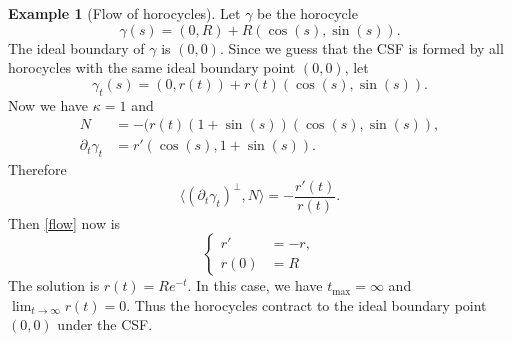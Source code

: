 \documentclass[12pt]{amsart}
\theoremstyle{plain}
\theoremstyle{definition}
\newtheorem{example}[theorem]{Example}
\begin{document}
\begin{example}[Flow of horocycles]
\label{ex:circle2}
Let $\gamma$ be the horocycle 
$$\gamma(s)=(0,R)+R\left( \cos(s), \sin(s)\right).$$
The ideal boundary  of $\gamma$ is $(0,0)$. Since we guess that the CSF is formed by all horocycles with the same ideal boundary point $(0,0)$, let  
 $$\gamma_t(s) = (0,r(t))+r(t)(\cos(s),  \sin(s)).$$ 
 Now we have $\kappa=1$ and  
 \begin{equation*}
 \begin{split}
 N&=-( r(t)(1+\sin(s))(\cos(s),\sin(s)),\\
 \partial_t\gamma_t&=r'(\cos(s),1+\sin(s)).
 \end{split}
 \end{equation*}
  Therefore
 $$\langle( \partial_t\gamma_t)^\perp,N\rangle=-\frac{r'(t)}{r(t)}.$$
 Then \eqref{flow} now is 
 \begin{equation*}
 \left\{
 \begin{split}
r'&= -r,\\
   r(0) &= R \end{split}
   \right.
   \end{equation*}
    The solution   is   $r(t) = Re^{-t}$.
  In this case, we have  $t_{\text{max}} =\infty$ and $\lim_{t\to\infty}r(t)=0$. Thus the horocycles  contract to   the ideal boundary point $(0,0)$ under the CSF.
\end{example} 
\end{document}
